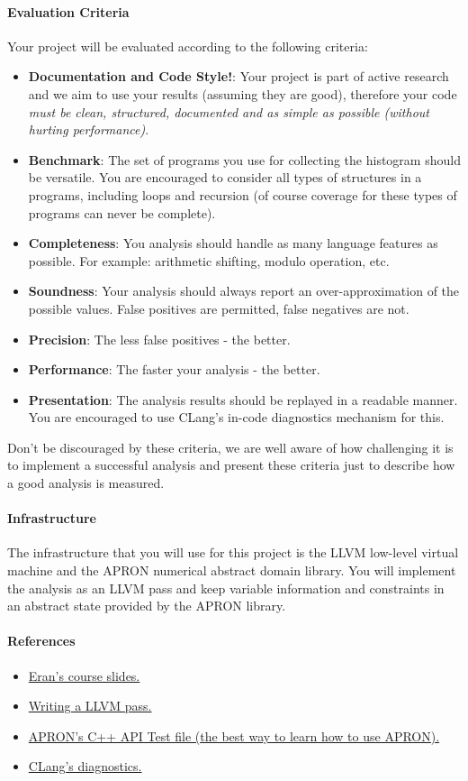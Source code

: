 \documentclass[english]{article}
\begin{document}
\paragraph{Evaluation Criteria}
Your project will be evaluated according to the following criteria:
\begin{itemize}
\item \textbf{Documentation and Code Style!}: Your project is part of active research and we aim to use your results (assuming they are good), therefore your code \emph{must be clean, structured, documented and as simple as possible (without hurting performance)}.
\item \textbf{Benchmark}: The set of programs you use for collecting the histogram should be versatile. You are encouraged to consider all types of structures in a programs, including loops and recursion (of course coverage for these types of programs can never be complete).
\item \textbf{Completeness}: You analysis should handle as many language features as possible. For example: arithmetic shifting, modulo operation, etc.
\item \textbf{Soundness}: Your analysis should always report an over-approximation of the possible values. False positives are permitted, false negatives are not.
\item \textbf{Precision}: The less false positives - the better.
\item \textbf{Performance}: The faster your analysis - the better.
\item \textbf{Presentation}: The analysis results should be replayed in a readable manner. You are encouraged to use CLang's in-code diagnostics mechanism for this.
\end{itemize}
Don't be discouraged by these criteria, we are well aware of how challenging it is to implement a successful analysis and present these criteria just to describe how a good analysis is measured.
\paragraph{Infrastructure} The infrastructure that you will use for this project is the LLVM low-level virtual machine and the APRON numerical abstract domain library. You will implement the analysis as an LLVM pass and keep variable information and constraints in an abstract state provided by the APRON library.
\paragraph{References}
\begin{itemize}
\item \href{http://www.cs.technion.ac.il/~yahave/courses/paps2011/}{Eran's course slides.}
\item \href{http://llvm.org/docs/WritingAnLLVMPass.html}{Writing a LLVM pass.}
\item \href{https://gforge.inria.fr/scm/viewvc.php/apron/trunk/apronxx/apronxx_test.cc?view=markup&root=apron}{APRON's C++ API Test file (the best way to learn how to use APRON).}
\item \href{http://clang.llvm.org/diagnostics.html}{CLang's diagnostics.}
\end{itemize}
\end{document}

